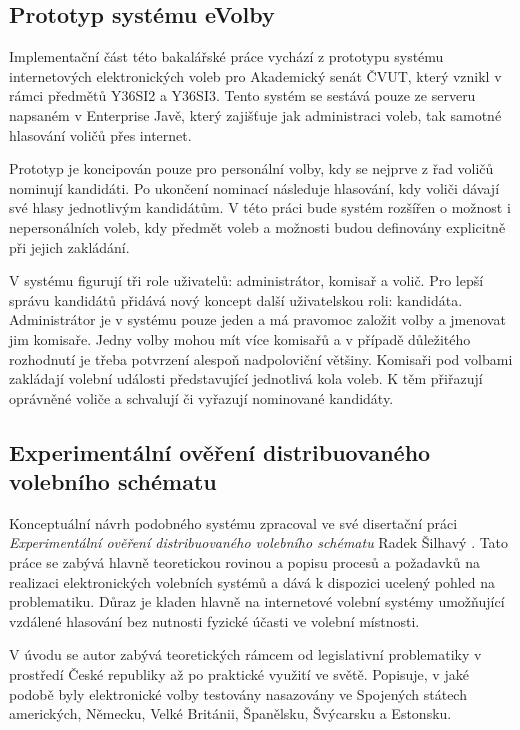 \documentclass[11pt,twoside,a4paper]{book}
\begin{document}
\subsection{Prototyp systému eVolby}
Implementační část této bakalářské práce vychází z prototypu systému internetových elektronických voleb pro Akademický senát ČVUT, který vznikl v rámci předmětů Y36SI2 a Y36SI3. Tento systém se sestává pouze ze serveru napsaném v Enterprise Javě, který zajišťuje jak administraci voleb, tak samotné hlasování voličů přes internet. 

Prototyp je koncipován pouze pro personální volby, kdy se nejprve z řad voličů nominují kandidáti. Po ukončení nominací následuje hlasování, kdy voliči dávají své hlasy jednotlivým kandidátům. V této práci bude systém rozšířen o možnost i nepersonálních voleb, kdy předmět voleb a možnosti budou definovány explicitně při jejich zakládání.

V systému figurují tři role uživatelů: administrátor, komisař a volič. Pro lepší správu kandidátů přidává nový koncept další uživatelskou roli: kandidáta. Administrátor je v systému pouze jeden a má pravomoc založit volby a jmenovat jim komisaře. Jedny volby mohou mít více komisařů a v případě důležitého rozhodnutí je třeba potvrzení alespoň nadpoloviční většiny. Komisaři pod volbami zakládají volební události představující jednotlivá kola voleb. K těm přiřazují oprávněné voliče a schvalují či vyřazují nominované kandidáty.

\subsection{Experimentální ověření distribuovaného volebního schématu}
Konceptuální návrh podobného systému zpracoval ve své disertační práci \textit{Experimentální ověření distribuovaného
volebního schématu} Radek Šilhavý \cite{art:silhavy}. Tato práce se zabývá hlavně teoretickou rovinou a popisu procesů a požadavků na realizaci elektronických volebních systémů a dává k dispozici ucelený pohled na problematiku. Důraz je kladen hlavně na internetové volební systémy umožňující vzdálené hlasování bez nutnosti fyzické účasti ve volební místnosti.

V úvodu se autor zabývá teoretických rámcem od legislativní problematiky v prostředí České republiky až po praktické využití ve světě. Popisuje, v jaké podobě byly elektronické volby testovány nasazovány ve Spojených státech amerických, Německu, Velké Británii, Španělsku, Švýcarsku a Estonsku.
\end{document}
